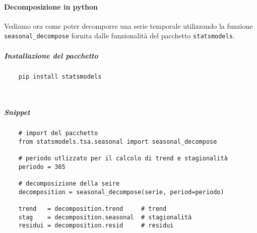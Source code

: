 \paragraph{Decomposizione in python}
Vediamo ora come poter decomporre una serie temporale utilizzando la funzione 
\texttt{seasonal\_decompose} fornita dalle funzionalità del pacchetto \texttt{statsmodels}.
\subparagraph*{Installazione del pacchetto}
\begin{verbatim}
    pip install statsmodels



\end{verbatim}

\subparagraph*{Snippet}
\begin{verbatim}
    # import del pacchetto 
    from statsmodels.tsa.seasonal import seasonal_decompose

    # periodo utlizzato per il calcolo di trend e stagionalità
    periodo = 365 

    # decomposizione della seire
    decomposition = seasonal_decompose(serie, period=periodo)

    trend   = decomposition.trend     # trend
    stag    = decomposition.seasonal  # stagionalità
    residui = decomposition.resid     # residui
\end{verbatim}